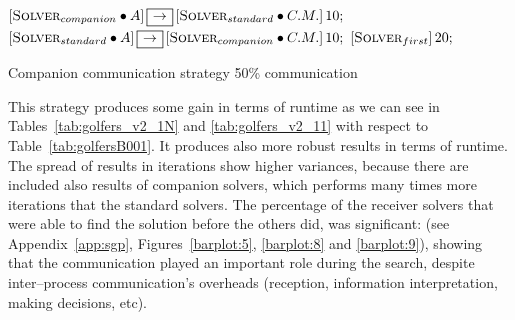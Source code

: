 \begin{algorithm}[H]
\dontprintsemicolon
\SetNoline
$\left[\eqsolverposl{companion}\posldot A\right] \onetoone \left[\eqsolverposl{standard}\posldot C.M.\right]10;$\;
$\left[\eqsolverposl{standard}\posldot A\right] \onetoone \left[\eqsolverposl{companion}\posldot C.M.\right]10;$\;
$\left[\textbf{{\sc Solver}}_{first}\right]20;$\;
\caption{Companion communication strategy 50\% communication}\label{comm:golfers_v2_50}
\end{algorithm}

This strategy produces some gain in terms of runtime as we can see in Tables~\ref{tab:golfers_v2_1N} and \ref{tab:golfers_v2_11} with respect to Table~\ref{tab:golfersB001}. It produces also more robust results in terms of runtime. The spread of results in iterations show higher variances, because there are included also results of companion solvers, which performs many times more iterations that the standard solvers. The percentage of the receiver solvers that were able to find the solution before the others did, was significant:  (see Appendix~\ref{app:sgp}, Figures~\ref{barplot:5}, \ref{barplot:8} and \ref{barplot:9}), showing that the communication played an important role during the search, despite inter--process communication's overheads (reception, information interpretation, making decisions, etc).

\begin{table}
\captionsetup{belowskip=6pt,aboveskip=6pt}
\centering 
\renewcommand{\arraystretch}{1}
\caption{Companion \commstr{} with communication \oneTn}
\label{tab:golfers_v2_1N}
\end{table}

